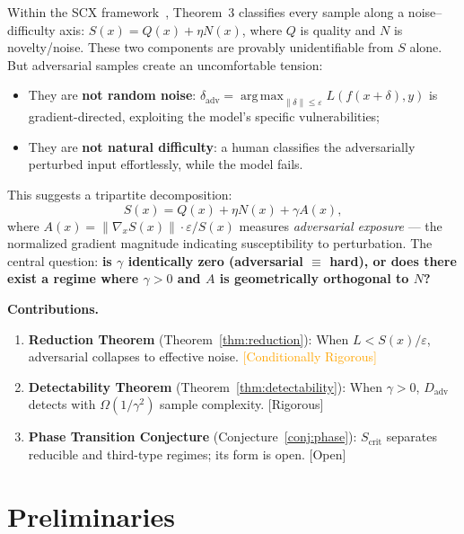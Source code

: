 \documentclass[12pt,a4paper]{article}
\newcommand{\rigorous}{\textcolor{green!50!black}{\small\textsf{[Rigorous]}}}
\newcommand{\conditionallyrigorous}{\textcolor{orange}{\small\textsf{[Conditionally Rigorous]}}}
\newcommand{\openquest}{\textcolor{red!70!black}{\small\textsf{[Open]}}}
\newcommand{\argmax}{\operatorname*{arg\,max}}
\begin{document}
Within the SCX framework~\citep{scx2024cercis}, Theorem~3 classifies every
sample along a noise--difficulty axis: $S(x) = Q(x) + \eta N(x)$, where
$Q$ is quality and $N$ is novelty/noise.  These two components are provably
unidentifiable from $S$ alone.  But adversarial samples create an
uncomfortable tension:
\begin{itemize}
    \item They are \textbf{not random noise}: $\delta_{\mathrm{adv}} =
          \argmax_{\|\delta\|\leq\varepsilon} L(f(x+\delta), y)$ is
          gradient-directed, exploiting the model's specific vulnerabilities;
    \item They are \textbf{not natural difficulty}: a human classifies the
          adversarially perturbed input effortlessly, while the model fails.
\end{itemize}

This suggests a tripartite decomposition:
\begin{equation}\label{eq:tripartite}
    S(x) = Q(x) + \eta N(x) + \gamma A(x),
\end{equation}
where $A(x) = \|\nabla_x S(x)\| \cdot \varepsilon / S(x)$ measures
\emph{adversarial exposure} --- the normalized gradient magnitude indicating
susceptibility to perturbation.  The central question: \textbf{is $\gamma$
identically zero (adversarial $\equiv$ hard), or does there exist a regime
where $\gamma > 0$ and $A$ is geometrically orthogonal to $N$?}

\medskip\noindent
\textbf{Contributions.}
\begin{enumerate}[label=(\arabic*)]
    \item \textbf{Reduction Theorem} (Theorem~\ref{thm:reduction}):
          When $L < S(x)/\varepsilon$, adversarial collapses to effective
          noise.  \conditionallyrigorous
    \item \textbf{Detectability Theorem} (Theorem~\ref{thm:detectability}):
          When $\gamma > 0$, $D_{\mathrm{adv}}$ detects with
          $\Omega(1/\gamma^2)$ sample complexity.  \rigorous
    \item \textbf{Phase Transition Conjecture} (Conjecture~\ref{conj:phase}):
          $S_{\mathrm{crit}}$ separates reducible and third-type regimes;
          its form is open.  \openquest
\end{enumerate}

\section{Preliminaries}
\end{document}
